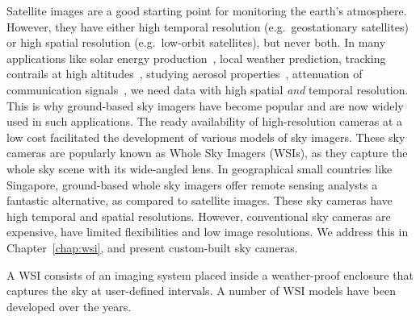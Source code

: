 Satellite images are a good starting point for monitoring the earth's atmosphere. However, they have either high temporal resolution (e.g.\ geostationary satellites) or high spatial resolution (e.g.\ low-orbit satellites), but never both. In many applications like solar energy production~\cite{solar_irr_pred}, local weather prediction, tracking contrails at high altitudes~\cite{contrail_WSI}, studying aerosol properties~\cite{fuse_AOD}, attenuation of communication signals~\cite{cloud_model_compare,radiosonde2014}, we need data with high spatial \emph{and} temporal resolution. This is why ground-based sky imagers have become popular and are now widely used in such applications. The ready availability of high-resolution cameras at a low cost facilitated the development of various models of sky imagers. These sky cameras are popularly known as Whole Sky Imagers (WSIs), as they capture the whole sky scene with its wide-angled lens. In geographical small countries like Singapore, ground-based whole sky imagers offer remote sensing analysts a fantastic alternative, as compared to satellite images. These sky cameras have high temporal and spatial resolutions. However, conventional sky cameras are expensive, have limited flexibilities and low image resolutions. We address this in Chapter~\ref{chap:wsi}, and present custom-built sky cameras.

A WSI consists of an imaging system placed inside a weather-proof enclosure that captures the sky at user-defined intervals. A number of WSI models have been developed over the years. 


